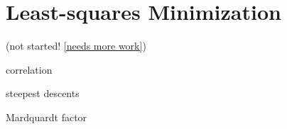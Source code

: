 \chapter{Least-squares Minimization}\label{Chap:Leastsquares}

(not started! \ref{needs more work})

correlation

steepest descents

Mardquardt factor